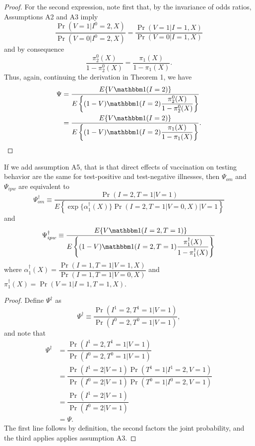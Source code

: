 \begin{appendix}
\begin{proof}
    For the second expression, note first that, by the invariance of odds ratios, Assumptions A2 and A3 imply
    \begin{equation*}
        \dfrac{\Pr(V = 1 | I^0 = 2, X)}{\Pr(V = 0 | I^0 = 2, X)} = \dfrac{\Pr(V = 1 | I = 1, X)}{\Pr(V = 0 | I = 1, X)}
    \end{equation*}
    and by consequence 
    \begin{equation*}
        \dfrac{\pi^0_2(X)}{1 - \pi^0_2(X)} = \dfrac{\pi_1(X)}{1 - \pi_1(X)}.
    \end{equation*}
    Thus, again, continuing the derivation in Theorem 1, we have 
    \begin{align*}
        \Psi &= \dfrac{E\{V \mathbbm 1 (I = 2)\}}{E\left\{(1 - V)\mathbbm 1 (I = 2) \dfrac{\pi^0_2(X)}{1-\pi^0_2(X)}\right\}} \\
        &= \dfrac{E\{V \mathbbm 1 (I = 2)\}}{E\left\{(1 - V)\mathbbm 1 (I = 2) \dfrac{\pi_1(X)}{1-\pi_1(X)}\right\}}.
    \end{align*}
    \end{proof}
    \newpage
    
    \begin{corollary}\label{corollary1}
    If we add assumption A5, that is that direct effects of vaccination on testing behavior are the same for test-positive and test-negative illnesses, then $\Psi_{om}$ and $\Psi_{ipw}$ are equivalent to
    \begin{equation}
        \Psi^\dagger_{om} \equiv \dfrac{\Pr(I = 2, T = 1 | V = 1)}{E\left\{ \exp\{\alpha^\dagger_1(X)\} \Pr(I = 2, T = 1 | V = 0, X) \Big| V = 1 \right\}}
    \end{equation}
    and 
    \begin{equation}
        \Psi^\dagger_{ipw} \equiv \dfrac{E\{V \mathbbm 1 (I = 2, T = 1)\}}{E\left\{ (1 - V) \mathbbm 1(I = 2, T = 1) \dfrac{\pi^\dagger_1(X)}{1 - \pi^\dagger_1(X)}\right\}}
    \end{equation}
    where $\alpha^\dagger_1(X) = \dfrac{\Pr(I = 1, T = 1 | V = 1, X)}{\Pr(I = 1, T = 1 | V = 0, X)}$ and $\pi^\dagger_1(X) = \Pr(V = 1| I = 1, T = 1, X)$.
    \end{corollary}
    
    \begin{proof}
        Define $\Psi^\dagger$ as 
        \begin{equation*}
            \Psi^\dagger \equiv  \dfrac{\Pr(I^1=2, T^1 = 1|V=1)}{\Pr(I^0=2, T^0 = 1|V=1)},
        \end{equation*}
        and note that
        \begin{align*}
            \Psi^\dagger &= \dfrac{\Pr(I^1=2, T^1 = 1|V=1)}{\Pr(I^0=2, T^0 = 1|V=1)} \\
            &= \dfrac{\Pr(I^1 = 2 | V = 1)\Pr(T^1 = 1 | I^1 = 2, V = 1)}{\Pr(I^0=2|V=1)\Pr(T^0 = 1 | I^0 = 2, V = 1)} \\
            & = \dfrac{\Pr(I^1 = 2 | V = 1)}{\Pr(I^0 = 2 | V = 1)} \\
            &= \Psi.
        \end{align*}
        The first line follows by definition, the second factors the joint probability, and the third applies applies assumption A3. 
    

\end{proof}
\end{appendix}
